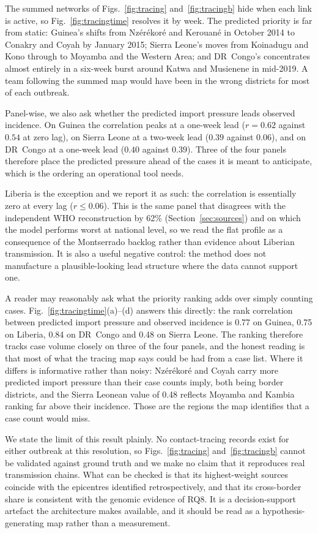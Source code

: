 \documentclass[conference]{IEEEtran}
\begin{document}
The summed networks of Figs.~\ref{fig:tracing} and~\ref{fig:tracingb} hide when each link is active, so Fig.~\ref{fig:tracingtime} resolves it by week. The predicted priority is far from static: Guinea's shifts from Nz\'er\'ekor\'e and Kerouan\'e in October 2014 to Conakry and Coyah by January 2015; Sierra Leone's moves from Koinadugu and Kono through to Moyamba and the Western Area; and DR~Congo's concentrates almost entirely in a six-week burst around Katwa and Musienene in mid-2019. A team following the summed map would have been in the wrong districts for most of each outbreak.

Panel-wise, we also ask whether the predicted import pressure leads observed incidence. On Guinea the correlation peaks at a one-week lead ($r=0.62$ against $0.54$ at zero lag), on Sierra Leone at a two-week lead ($0.39$ against $0.06$), and on DR~Congo at a one-week lead ($0.40$ against $0.39$). Three of the four panels therefore place the predicted pressure ahead of the cases it is meant to anticipate, which is the ordering an operational tool needs.

Liberia is the exception and we report it as such: the correlation is essentially zero at every lag ($r\leq0.06$). This is the same panel that disagrees with the independent WHO reconstruction by 62\% (Section~\ref{sec:sources}) and on which the model performs worst at national level, so we read the flat profile as a consequence of the Montserrado backlog rather than evidence about Liberian transmission. It is also a useful negative control: the method does not manufacture a plausible-looking lead structure where the data cannot support one.

A reader may reasonably ask what the priority ranking adds over simply counting cases. Fig.~\ref{fig:tracingtime}(a)--(d) answers this directly: the rank correlation between predicted import pressure and observed incidence is 0.77 on Guinea, 0.75 on Liberia, 0.84 on DR~Congo and 0.48 on Sierra Leone. The ranking therefore tracks case volume closely on three of the four panels, and the honest reading is that most of what the tracing map says could be had from a case list. Where it differs is informative rather than noisy: Nz\'er\'ekor\'e and Coyah carry more predicted import pressure than their case counts imply, both being border districts, and the Sierra Leonean value of 0.48 reflects Moyamba and Kambia ranking far above their incidence. Those are the regions the map identifies that a case count would miss.

We state the limit of this result plainly. No contact-tracing records exist for either outbreak at this resolution, so Figs.~\ref{fig:tracing} and~\ref{fig:tracingb} cannot be validated against ground truth and we make no claim that it reproduces real transmission chains. What can be checked is that its highest-weight sources coincide with the epicentres identified retrospectively, and that its cross-border share is consistent with the genomic evidence of RQ8. It is a decision-support artefact the architecture makes available, and it should be read as a hypothesis-generating map rather than a measurement.
\end{document}
